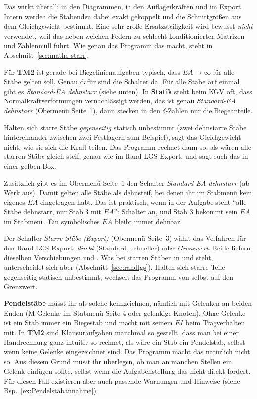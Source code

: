 Das wirkt überall: in den Diagrammen, in den Auflagerkräften und im Export. Intern werden die
Stabenden dabei exakt gekoppelt und die Schnittgrößen aus dem Gleichgewicht bestimmt. Eine sehr
große Ersatzsteifigkeit wird bewusst \emph{nicht} verwendet, weil das neben weichen Federn zu schlecht konditionierten Matrizen
und Zahlenmüll führt. Wie genau das Programm das macht, steht in Abschnitt~\ref{sec:mathe-starr}.

Für \textbf{TM2} ist gerade bei Biegelinienaufgaben typisch, dass $EA \to \infty$ für alle Stäbe gelten soll.
Genau dafür sind die Schalter da. Für alle Stäbe auf einmal gibt es \emph{Standard-EA dehnstarr} (siehe unten). In \textbf{Statik} steht beim KGV oft, dass
Normalkraftverformungen vernachlässigt werden, das ist genau \emph{Standard-EA dehnstarr}
(Obermenü Seite~1), dann stecken in den $\delta$-Zahlen nur die Biegeanteile.

Halten sich starre Stäbe \emph{gegenseitig} statisch unbestimmt (zwei dehnstarre Stäbe
hintereinander zwischen zwei Festlagern zum Beispiel), sagt das Gleichgewicht nicht, wie sie sich
die Kraft teilen. Das Programm rechnet dann so, als wären alle starren Stäbe gleich steif, genau
wie im Rand-LGS-Export, und sagt euch das in einer gelben Box.

Zusätzlich gibt es im Obermenü Seite~1 den Schalter \emph{Standard-EA dehnstarr} (ab Werk aus).
Damit gelten alle Stäbe als dehnsteif, bei denen ihr im Stabmenü kein eigenes $EA$ eingetragen
habt. Das ist praktisch, wenn in der Aufgabe steht \enquote{alle Stäbe dehnstarr, nur Stab 3 mit
$EA$}: Schalter an, und Stab 3 bekommt sein $EA$ im Stabmenü. Ein symbolisches $EA$ bleibt immer
dehnbar.

Der Schalter \emph{Starre Stäbe (Export)} (Obermenü Seite~3) wählt das Verfahren für den
Rand-LGS-Export: \emph{direkt} (Standard, schneller) oder \emph{Grenzwert}. Beide liefern
dieselben Verschiebungen  und . Was bei starren Stäben in  und
 steht, unterscheidet sich aber (Abschnitt~\ref{sec:randlgs}). Halten sich starre Teile
gegenseitig statisch unbestimmt, wechselt das Programm von selbst auf den Grenzwert.

\textbf{Pendelstäbe} müsst ihr als solche kennzeichnen, nämlich mit Gelenken an beiden Enden
(M-Gelenke im Stabmenü Seite 4 oder gelenkige Knoten). Ohne Gelenke ist ein Stab immer ein
Biegestab und macht mit seinem $EI$ beim Tragverhalten mit. In \textbf{TM2} sind Klausuraufgaben manchmal so gestellt,
dass man bei einer Handrechnung ganz intuitiv so rechnet, als wäre ein Stab ein Pendelstab, selbst wenn keine Gelenke eingezeichnet sind.
Das Programm macht das natürlich nicht so. Aus diesem Grund müsst ihr überlegen, ob man an manchen Stellen ein Gelenk einfügen sollte, selbst wenn die
Aufgabenstellung das nicht direkt fordert. Für diesen Fall existieren aber auch passende Warnungen und Hinweise (siehe Bsp.~\ref{ex:Pendelstabannahme}).

